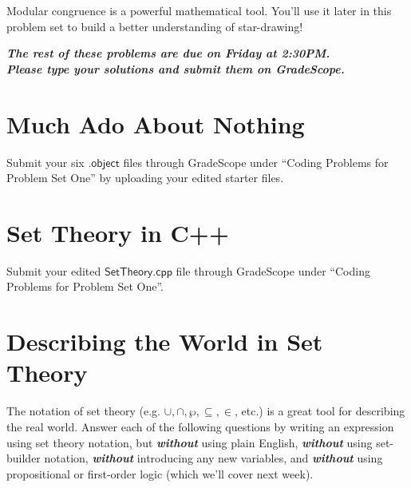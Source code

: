 \documentclass{article}
\renewcommand{\(}{\left(}
\renewcommand{\)}{\right)}
\theoremstyle{plain}
\theoremstyle{plain}
\theoremstyle{definition}
\begin{document}
Modular congruence is a powerful mathematical tool. You'll use it later in this problem set to build a better
understanding of star-drawing!

\pagebreak

\begin{center}
\textit{\textbf{The rest of these problems are due on Friday at 2:30PM. \\ Please type your solutions and submit them on GradeScope.}}
\end{center}

\section{Much Ado About Nothing}

\begin{shaded}
Submit your six $\mathsf{.object}$ files through GradeScope under ``Coding Problems for Problem Set One'' by uploading your edited starter files. 
\end{shaded}

\section{Set Theory in C++}

\begin{shaded}
Submit your edited $\mathsf{SetTheory.cpp}$ file through GradeScope under ``Coding Problems for Problem Set One''.
\end{shaded}

\section{Describing the World in Set Theory}

The notation of set theory (e.g. $\cup, \cap, \wp, \subseteq, \in$, etc.) is a great tool for describing the real world. Answer
each of the following questions by writing an expression using set theory notation, but \textit{\textbf{without}} using
plain English, \textit{\textbf{without}} using set-builder notation, \textit{\textbf{without}} introducing any new variables, and \textit{\textbf{without}} using propositional or first-order logic (which we'll cover next week).
\end{document}
